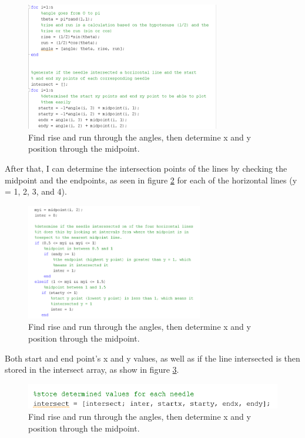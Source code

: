 \documentclass[11pt]{article}
\begin{document}
\begin{figure}[H]
\includegraphics[width=\textwidth, height = 2.2in]{f2.png}
\caption{Find rise and run through the angles, then determine x and y position through the midpoint.}
\label{fig:C2}
\end{figure}

After that, I can determine the intersection points of the lines by checking the midpoint and the endpoints, as seen in figure \ref{fig:C3} for each of the horizontal lines (y = 1, 2, 3, and 4).

\begin{figure}[H]
\begin{centering}
\includegraphics[width=\textwidth, height = 2in]{f3.png}
\end{centering}
\caption{Find rise and run through the angles, then determine x and y position through the midpoint.}
\label{fig:C3}
\end{figure}

Both start and end point's x and y values, as well as if the line intersected is then stored in the intersect array, as show in figure \ref{fig:C4}. 

\begin{figure}[H]
\begin{centering}
\includegraphics[scale=.7]{f4.png}
\end{centering}
\caption{Find rise and run through the angles, then determine x and y position through the midpoint.}
\label{fig:C4}
\end{figure}
\end{document}

